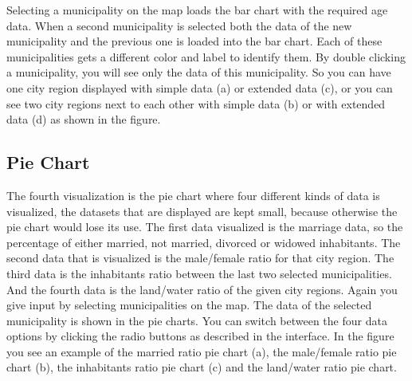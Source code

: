 \documentclass[a4paper,twoside,11pt]{article}
\begin{document}
\newline
\newline
Selecting a municipality on the map loads the bar chart with the required age data. When a second municipality is selected both the data of the new municipality and the previous one is loaded into the bar chart. Each of these municipalities gets a different color and label to identify them. By double clicking a municipality, you will see only the data of this municipality. \newline
So you can have one city region displayed with simple data (a) or extended data (c), or you can see two city regions next to each other with simple data (b) or with extended data (d) as shown in the figure. \newline
\subsection{Pie Chart}
The fourth visualization is the pie chart where four different kinds of data is visualized, the datasets that are displayed are kept small, because otherwise the pie chart would lose its use. The first data visualized is the marriage data, so the percentage of either married, not married, divorced or widowed inhabitants. The second data that is visualized is the male/female ratio for that city region. The third data is the inhabitants ratio between the last two selected municipalities. And the fourth data is the land/water ratio of the given city regions. \newline
Again you give input by selecting municipalities on the map. The data of the selected municipality is shown in the pie charts. You can switch between the four data options by clicking the radio buttons as described in the interface. In the figure you see an example of the married ratio pie chart (a), the male/female ratio pie chart (b), the inhabitants ratio pie chart (c) and the land/water ratio pie chart.
\end{document}
